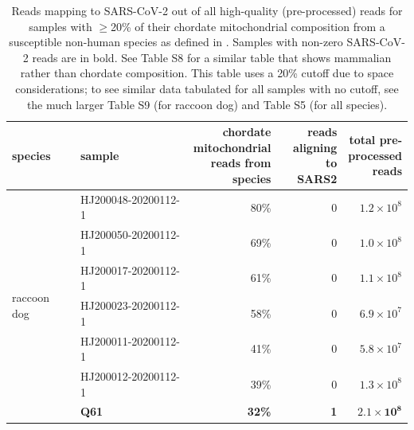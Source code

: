 \documentclass[9pt,twocolumn,twoside]{gsajnl_modified}
\begin{document}
\begin{table}
\caption{
Reads mapping to SARS-CoV-2 out of all high-quality (pre-processed) reads for samples with $\ge$20\% of their chordate mitochondrial composition from a susceptible non-human species as defined in \citet{crits2023genetic}.
Samples with non-zero SARS-CoV-2 reads are in bold.
See Table S8 for a similar table that shows mammalian rather than chordate composition.
This table uses a 20\% cutoff due to space considerations; to see similar data tabulated for all samples with no cutoff, see the much larger Table S9 (for raccoon dog) and Table S5 (for all species).
\label{tab:susceptible}
}
{\scriptsize
\setlength{\tabcolsep}{5pt}
\renewcommand{\arraystretch}{1.3}
\begin{tabular}{llrrr}
\toprule
species      &   sample              & \makecell[r]{chordate \\ mitochondrial \\ reads from \\ species} &  \makecell[r]{reads \\ aligning \\ to SARS2} & \makecell[r]{ total pre-\\processed \\ reads} \\ 
\midrule
\multirow{14}{*}{raccoon dog} & HJ200048-20200112-1 &                                80\% &                        0 &                   $1.2\times 10^8$ \\
                 & HJ200050-20200112-1 &                                69\% &                        0 &                     $1.0 \times 10^8$ \\
                 & HJ200017-20200112-1 &                                61\% &                        0 &                   $1.1 \times 10^8$ \\
                 & HJ200023-20200112-1 &                                58\% &                        0 &                   $6.9 \times 10^7$ \\
                 & HJ200011-20200112-1 &                                41\% &                        0 &                   $5.8 \times 10^7$ \\
                 & HJ200012-20200112-1 &                                39\% &                        0 &                   $1.3 \times 10^8$ \\
                 & {\bf Q61} &                                {\bf 32\%} &                        {\bf 1} &                   $\mathbf{2.1 \times 10^8}$ \\

\end{tabular}}
\end{table}
\end{document}
